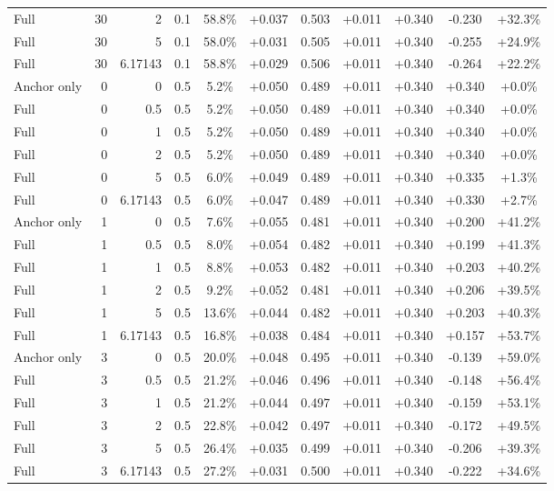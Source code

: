 \begin{table}[htbp]
\begin{tabular}{lrrrccccccc}
Full & 30 & 2 & 0.1 & 58.8\% & +0.037 & 0.503 & +0.011 & +0.340 & -0.230 & +32.3\% \\
Full & 30 & 5 & 0.1 & 58.0\% & +0.031 & 0.505 & +0.011 & +0.340 & -0.255 & +24.9\% \\
Full & 30 & 6.17143 & 0.1 & 58.8\% & +0.029 & 0.506 & +0.011 & +0.340 & -0.264 & +22.2\% \\
Anchor only & 0 & 0 & 0.5 & 5.2\% & +0.050 & 0.489 & +0.011 & +0.340 & +0.340 & +0.0\% \\
Full & 0 & 0.5 & 0.5 & 5.2\% & +0.050 & 0.489 & +0.011 & +0.340 & +0.340 & +0.0\% \\
Full & 0 & 1 & 0.5 & 5.2\% & +0.050 & 0.489 & +0.011 & +0.340 & +0.340 & +0.0\% \\
Full & 0 & 2 & 0.5 & 5.2\% & +0.050 & 0.489 & +0.011 & +0.340 & +0.340 & +0.0\% \\
Full & 0 & 5 & 0.5 & 6.0\% & +0.049 & 0.489 & +0.011 & +0.340 & +0.335 & +1.3\% \\
Full & 0 & 6.17143 & 0.5 & 6.0\% & +0.047 & 0.489 & +0.011 & +0.340 & +0.330 & +2.7\% \\
Anchor only & 1 & 0 & 0.5 & 7.6\% & +0.055 & 0.481 & +0.011 & +0.340 & +0.200 & +41.2\% \\
Full & 1 & 0.5 & 0.5 & 8.0\% & +0.054 & 0.482 & +0.011 & +0.340 & +0.199 & +41.3\% \\
Full & 1 & 1 & 0.5 & 8.8\% & +0.053 & 0.482 & +0.011 & +0.340 & +0.203 & +40.2\% \\
Full & 1 & 2 & 0.5 & 9.2\% & +0.052 & 0.481 & +0.011 & +0.340 & +0.206 & +39.5\% \\
Full & 1 & 5 & 0.5 & 13.6\% & +0.044 & 0.482 & +0.011 & +0.340 & +0.203 & +40.3\% \\
Full & 1 & 6.17143 & 0.5 & 16.8\% & +0.038 & 0.484 & +0.011 & +0.340 & +0.157 & +53.7\% \\
Anchor only & 3 & 0 & 0.5 & 20.0\% & +0.048 & 0.495 & +0.011 & +0.340 & -0.139 & +59.0\% \\
Full & 3 & 0.5 & 0.5 & 21.2\% & +0.046 & 0.496 & +0.011 & +0.340 & -0.148 & +56.4\% \\
Full & 3 & 1 & 0.5 & 21.2\% & +0.044 & 0.497 & +0.011 & +0.340 & -0.159 & +53.1\% \\
Full & 3 & 2 & 0.5 & 22.8\% & +0.042 & 0.497 & +0.011 & +0.340 & -0.172 & +49.5\% \\
Full & 3 & 5 & 0.5 & 26.4\% & +0.035 & 0.499 & +0.011 & +0.340 & -0.206 & +39.3\% \\
Full & 3 & 6.17143 & 0.5 & 27.2\% & +0.031 & 0.500 & +0.011 & +0.340 & -0.222 & +34.6\% \\

\end{tabular}
\end{table}
